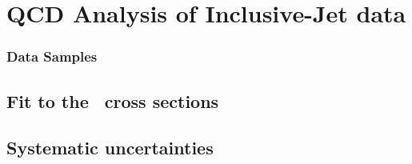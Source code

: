 %

\section{QCD Analysis of Inclusive-Jet data}
\label{sec:aspdffit}

\subsubsection{Data Samples}
\label{subsec:aspdffitdata}


\subsection{Fit to the \dsdetjetb~cross sections}
\label{subsec:doubledifasfit}



\subsection{Systematic uncertainties}
\label{subsec:assysunc}

